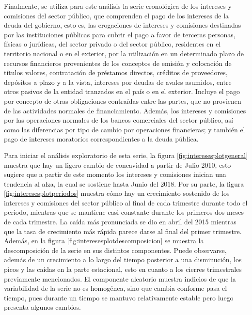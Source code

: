 \documentclass[
]{article}
\begin{document}
Finalmente, se utiliza para este análisis la serie cronológica de los
intereses y comisiones del sector público, que comprenden el pago de los
intereses de la deuda del gobierno, esto es, las erogaciones de
intereses y comisiones destinadas por las instituciones públicas para
cubrir el pago a favor de terceras personas, físicas o jurídicas, del
sector privado o del sector público, residentes en el territorio
nacional o en el exterior, por la utilización en un determinado plazo de
recursos financieros provenientes de los conceptos de emisión y
colocación de títulos valores, contratación de préstamos directos,
créditos de proveedores, depósitos a plazo y a la vista, intereses por
deudas de avales asumidos, entre otros pasivos de la entidad tranzados
en el país o en el exterior. Incluye el pago por concepto de otras
obligaciones contraídas entre las partes, que no provienen de las
actividades normales de financiamiento. Además, los intereses y
comisiones por las operaciones normales de los bancos comerciales del
sector público, así como las diferencias por tipo de cambio por
operaciones financieras; y también el pago de intereses moratorios
correspondientes a la deuda pública.

Para iniciar el análisis exploratorio de esta serie, la figura
\ref{fig:interesesplotgeneral} muestra que hay un ligero cambio de
concavidad a partir de Julio 2010, esto sugiere que a partir de este
momento los intereses y comisiones inician una tendencia al alza, la
cual se sostiene hasta Junio del 2018. Por su parte, la figura
\ref{fig:interesesplotperiodos} muestra cómo hay un crecimiento
sostenido de los intereses y comisiones del sector público al final de
cada trimestre durante todo el periodo, mientras que se mantiene casi
constante durante los primeros dos meses de cada trimestre. La caída más
pronunciada se dio en abril del 2015 mientras que la tasa de crecimiento
más rápida parece darse al final del primer trimestre. Además, en la
figura \ref{fig:interesesplotdescomposicion} se muestra la
descomposición de la serie en sus distintos componentes. Puede
observarse, además de un crecimiento a lo largo del tiempo posterior a
una disminución, los picos y las caídas en la parte estacional, esto en
cuanto a los cierres trimestrales previamente mencionados. El componente
aleatorio muestra indicios de que la variabilidad de la serie no es
homogénea, sino que cambia conforme pasa el tiempo, pues durante un
tiempo se mantuvo relativamente estable pero luego presenta algunos
cambios.
\end{document}
